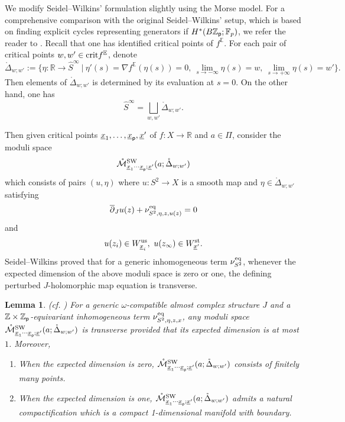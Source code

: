 \documentclass[reqno, 10pt]{amsart}
\numberwithin{equation}{section}
\numberwithin{equation}{section}
\newtheorem{lemma}[thm]{Lemma}
\theoremstyle{definition}
\theoremstyle{remark}
\newcommand{\beqn}{\begin{equation*}}
\newcommand{\eeqn}{\end{equation*}}
\newcommand{\ov}{\overline}
\newcommand{\mb}{\mathbb}
\newcommand{\mc}{\mathcal}
\newcommand{\p}{{\sf p}}
\newcommand{\zp}{{{\mb Z}_{\sf p}}}
\newcommand{\ep}{{{\mathbb E}}}
\newcommand{\wh}{\widehat}
\newcommand{\uds}[1]{\underline{\smash{#1}}}
\begin{document}
We modify Seidel--Wilkins' formulation slightly using the Morse model. For a comprehensive comparison with the original Seidel--Wilkins' setup, which is based on finding explicit cycles representing generators if $H^*(B\zp; {\mb F}_p)$, we refer the reader to \cite[Appendix A]{BSWX}. Recall that one has identified critical points of $f^\ep$. For each pair of critical points $w, w'\in {\rm crit} f^\ep$, denote
\beqn
\mathring \Delta_{w; w'}:= \Big\{ \eta: {\mb R} \to \wh S^\infty\ |\ \eta'(s) = \nabla f^\ep (\eta (s)) = 0,\ \lim_{s \to -\infty}  \eta(s) = w,\ \lim_{s \to +\infty} \eta (s) = w' \Big\}.
\eeqn
Then elements of $\mathring \Delta_{w;w'}$ is determined by its evaluation at $s = 0$. On the other hand, one has
\beqn
\wh S^\infty = \bigsqcup_{w, w'} \mathring \Delta_{w; w'}.
\eeqn

Then given critical points $\uds x_1, \ldots, \uds x_{\p}, \uds x'$ of $f: X \to {\mb R}$ and $a \in \Pi$, consider the moduli space
\beqn
\mathring {\mc M}_{\uds x_1 \cdots \uds x_{\p}; \uds x'}^{\rm SW}(a; \mathring \Delta_{w; w'})
\eeqn
which consists of pairs $(u, \eta)$ where $u: S^2 \to X$ is a smooth map and $\eta \in \mathring \Delta_{w; w'}$ satisfying
\beqn
\ov\partial_J u(z) + \nu_{S^2, \eta, z, u(z)}^{\rm eq} = 0
\eeqn
and 
\beqn
u(z_i) \in W^{\rm us}_{\uds x_i},\ u(z_\infty) \in W^{\rm st}_{\uds x'}.
\eeqn
Seidel--Wilkins proved that for a generic inhomogeneous term $\nu_{S^2}^{\rm eq}$, whenever the expected dimension of the above moduli space is zero or one, the defining perturbed $J$-holomorphic map equation is transverse. 

\begin{lemma}\label{lemma:seidel-wilkins}(cf. \cite[Lemma 4.1]{Seidel_Wilkins_2022}) For a generic $\omega$-compatible almost complex structure $J$ and a ${\mb Z}\times \zp$-equivariant inhomogeneous term $\nu_{S^2, \eta, z, x}^{\rm eq}$, any moduli space $\mathring {\mc M}_{\uds x_1 \cdots \uds x_\p; \uds x'}^{\rm SW}(a; \mathring \Delta_{w; w'})$ is transverse provided that its expected dimension is at most $1$. Moreover,
\begin{enumerate}
    \item When the expected dimension is zero, $\mathring {\mc M}_{\uds x_1 \cdots \uds x_\p; \uds x'}^{\rm SW}(a; \mathring \Delta_{w; w'})$ consists of finitely many points.

    \item When the expected dimension is one, $\mathring {\mc M}_{\uds x_1\cdots \uds x_\p; \uds x'}^{\rm SW}(a; \mathring \Delta_{w; w'})$ admits a natural compactification which is a compact 1-dimensional manifold with boundary. 
\end{enumerate}
\end{lemma}
\end{document}
